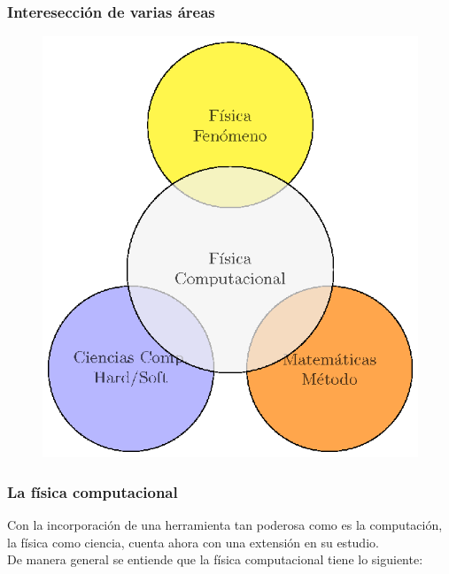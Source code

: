\documentclass[12pt]{beamer}
\begin{document}
\begin{frame}[fragile]
\frametitle{Interesección de varias áreas}
\begin{figure}
	\centering
	\includegraphics[scale=0.7]{Imagenes/figura_01.eps}
\end{figure}
\end{frame}
\begin{frame}[fragile]
\frametitle{La física computacional}
Con la incorporación de una herramienta tan poderosa como es la computación, la física como ciencia, cuenta ahora con una extensión en su estudio.
\\
\bigskip
\pause
De manera general se entiende que la física computacional tiene lo siguiente:
\end{frame}
\end{document}
